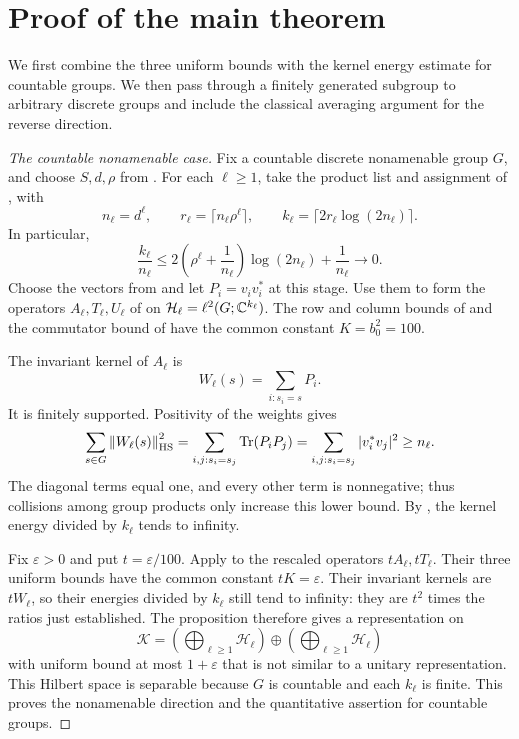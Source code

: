 \section{Proof of the main theorem}\label{sec:conclusion}

We first combine the three uniform bounds with the kernel energy estimate
for countable groups. We then pass through a finitely generated subgroup
to arbitrary discrete groups and include the classical averaging argument
for the reverse direction.

\begin{proof}[The countable nonamenable case]
Fix a countable discrete nonamenable group \(G\), and choose
\(S,d,\rho\) from .
For each \(\ell\ge1\), take the product list and assignment of
, with
\[
 n_\ell=d^\ell,\qquad
 r_\ell=\lceil n_\ell\rho^\ell\rceil,\qquad
 k_\ell=\lceil2r_\ell\log(2n_\ell)\rceil.
\]
In particular,
\begin{equation}\label{eq:dimension-ratio}
 \frac{k_\ell}{n_\ell}
 \le2\left(\rho^\ell+\frac1{n_\ell}\right)\log(2n_\ell)
       +\frac1{n_\ell}\longrightarrow0.
\end{equation}
Choose the vectors from  and let
\(P_i=v_iv_i^*\) at this stage. Use them to form the operators
\(A_\ell,T_\ell,U_\ell\) of  on
\(\mathcal H_\ell=\ell^2(G;\mathbb C^{k_\ell})\).
The row and column bounds of  and the
commutator bound of  have the common
constant \(K=b_0^2=100\).

The invariant kernel of \(A_\ell\) is
\[
 W_\ell(s)=\sum_{i:s_i=s}P_i.
\]
It is finitely supported. Positivity of the weights gives
\begin{equation}\label{eq:kernel-energy}
 \sum_{s\in G}\left\lVert W_\ell(s)\right\rVert_{\mathrm{HS}}^2
 =\sum_{i,j:s_i=s_j}\operatorname{Tr}(P_iP_j)
 =\sum_{i,j:s_i=s_j}|v_i^*v_j|^2
 \ge n_\ell.
\end{equation}
The diagonal terms equal one, and every other term is nonnegative;
thus collisions among group products only increase this lower bound.
By , the kernel energy divided by
\(k_\ell\) tends to infinity.

Fix \(\varepsilon>0\) and put \(t=\varepsilon/100\). Apply
 to the rescaled operators
\(tA_\ell,tT_\ell\). Their three uniform bounds have the common
constant \(tK=\varepsilon\). Their invariant kernels are
\(tW_\ell\), so their energies divided by \(k_\ell\) still tend to
infinity: they are \(t^2\) times the ratios just established.
The proposition therefore gives a representation on
\[
 \mathcal K=
 \left(\bigoplus_{\ell\ge1}\mathcal H_\ell\right)
 \oplus\left(\bigoplus_{\ell\ge1}\mathcal H_\ell\right)
\]
with uniform bound at most \(1+\varepsilon\) that is not similar to a
unitary representation. This Hilbert space is separable because \(G\)
is countable and each \(k_\ell\) is finite. This proves the nonamenable
direction and the quantitative assertion for countable groups.
\end{proof}

